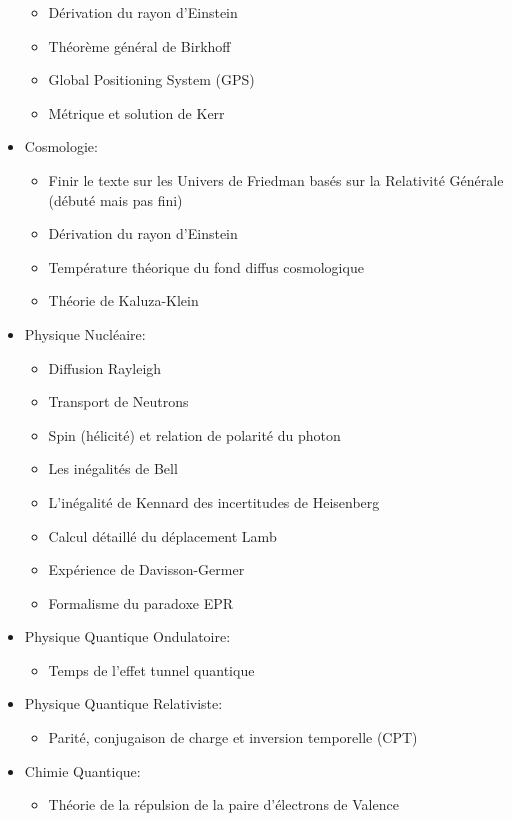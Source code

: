 \begin{itemize}
\begin{itemize}
				\item Dérivation du rayon d'Einstein
				\item Théorème général de Birkhoff
				\item Global Positioning System (GPS)
				\item Métrique et solution de Kerr	
			\end{itemize}
		\item Cosmologie:
			\begin{itemize}
				\item Finir le texte sur les Univers de Friedman basés sur la Relativité Générale (débuté mais pas fini)
				\item Dérivation du rayon d'Einstein
				\item Température théorique du fond diffus cosmologique
				\item Théorie de Kaluza-Klein
			\end{itemize}
		\item Physique Nucléaire:
			\begin{itemize}
				\item Diffusion Rayleigh
				\item Transport de Neutrons
				\item Spin (hélicité) et relation de polarité du photon
				\item Les inégalités de Bell
				\item L'inégalité de Kennard des incertitudes de Heisenberg
				\item Calcul détaillé du déplacement Lamb
				\item Expérience de Davisson-Germer
				\item Formalisme du paradoxe EPR
			\end{itemize}
		\item Physique Quantique Ondulatoire:
			\begin{itemize}
				\item Temps de l'effet tunnel quantique
			\end{itemize}
		\item Physique Quantique Relativiste:
			\begin{itemize}
				\item Parité, conjugaison de charge et inversion temporelle (CPT)
			\end{itemize}
		\item Chimie Quantique:
			\begin{itemize}
				\item Théorie de la répulsion de la paire d'électrons de Valence

\end{itemize}
\end{itemize}
